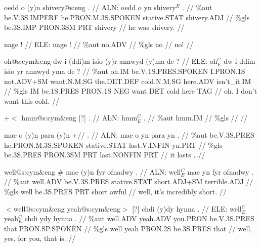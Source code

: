 \documentclass[a4paper,10pt]{article}
\begin{document}
\ex
\begingl[lingstyle=gergl]
\glchat oedd o (y)n shivery@s:eng . //
\glsurface ALN:  oedd o yn shivery$^{E}$ .  //
\glauto \%aut  be{\scriptsize .V.3S.IMPERF} he{\scriptsize .PRON.M.3S.SPOKEN} stative{\scriptsize .STAT} shivery{\scriptsize .ADJ}   //
\glmanual \%gls  be{\scriptsize .3S.IMP} PRON{\scriptsize .3SM} PRT shivery   //
\gleng he was shivery. //
\endgl
\xe

\ex
\begingl[lingstyle=gergl]
\glchat nage ! //
\glsurface ELE:  nage !  //
\glauto \%aut  no{\scriptsize .ADV}   //
\glmanual \%gls  no   //
\gleng no! //
\endgl
\xe

\ex
\begingl[lingstyle=gergl]
\glchat oh@s:cym\&eng dw i (ddi)m isio (y)r annwyd (y)ma de ? //
\glsurface ELE:  oh$^{C}_{E}$ dw i ddim isio yr annwyd yma de ?  //
\glauto \%aut  oh{\scriptsize .IM} be{\scriptsize .V.1S.PRES.SPOKEN} I{\scriptsize .PRON.1S} not{\scriptsize .ADV+SM} want{\scriptsize .N.M.SG} the{\scriptsize .DET.DEF} cold{\scriptsize .N.M.SG} here{\scriptsize .ADV} isn't\_it{\scriptsize .IM}   //
\glmanual \%gls  IM be{\scriptsize .1S.PRES} PRON{\scriptsize .1S} NEG want DET cold here TAG   //
\gleng oh, I don't want this cold. //
\endgl
\xe

\ex
\begingl[lingstyle=gergl]
\glchat +$<$ hmm@s:cym\&eng [?] . //
\glsurface ALN:  hmm$^{C}_{E}$ .  //
\glauto \%aut  hmm{\scriptsize .IM}   //
\glmanual \%gls     //
\gleng  //
\endgl
\xe

\ex
\begingl[lingstyle=gergl]
\glchat mae o (y)n para (y)n +// . //
\glsurface ALN:  mae o yn para yn .  //
\glauto \%aut  be{\scriptsize .V.3S.PRES} he{\scriptsize .PRON.M.3S.SPOKEN} stative{\scriptsize .STAT} last{\scriptsize .V.INFIN} yn{\scriptsize .PRT}   //
\glmanual \%gls  be{\scriptsize .3S.PRES} PRON{\scriptsize .3SM} PRT last{\scriptsize .NONFIN} PRT   //
\gleng it lasts \dots  //
\endgl
\xe

\ex
\begingl[lingstyle=gergl]
\glchat well@s:cym\&eng \# mae (y)n fyr ofnadwy . //
\glsurface ALN:  well$^{C}_{E}$ mae yn fyr ofnadwy .  //
\glauto \%aut  well{\scriptsize .ADV} be{\scriptsize .V.3S.PRES} stative{\scriptsize .STAT} short{\scriptsize .ADJ+SM} terrible{\scriptsize .ADJ}   //
\glmanual \%gls  well be{\scriptsize .3S.PRES} PRT short awful   //
\gleng well, it's incredibly short. //
\endgl
\xe

\ex
\begingl[lingstyle=gergl]
\glchat $<$well@s:cym\&eng yeah@s:cym\&eng$>$ [?] chdi (y)dy hynna . //
\glsurface ELE:  well$^{C}_{E}$ yeah$^{C}_{E}$ chdi ydy hynna .  //
\glauto \%aut  well{\scriptsize .ADV} yeah{\scriptsize .ADV} you{\scriptsize .PRON} be{\scriptsize .V.3S.PRES} that{\scriptsize .PRON.SP.SPOKEN}   //
\glmanual \%gls  well yeah PRON{\scriptsize .2S} be{\scriptsize .3S.PRES} that   //
\gleng well, yes, for you, that is. //
\endgl
\xe
\end{document}
